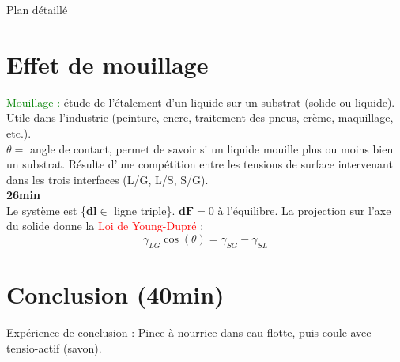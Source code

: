 \begin{reportBlock}{Plan détaillé}
\section{Effet de mouillage}
  \textcolor{green}{Mouillage :} étude de l'étalement d'un liquide sur un substrat (solide ou liquide). Utile dans l'industrie (peinture, encre, traitement des pneus, crème, maquillage, etc.).\\
  $\theta =$ angle de contact, permet de savoir si un liquide mouille plus ou moins bien un substrat. Résulte d'une compétition entre les tensions de surface intervenant dans les trois interfaces (L/G, L/S, S/G). \\
  \textbf{26min}\\
  Le système est \{\textbf{dl}$\in$ ligne triple\}. 
  $\textbf{dF}=0$ à l'équilibre. La projection sur l'axe du solide donne la \textcolor{red}{Loi de Young-Dupré} :
  \begin{equation}
      \gamma_{LG}\cos(\theta) = \gamma_{SG}-\gamma_{SL}
  \end{equation}
  
  \section*{Conclusion (40min)}
  Expérience de conclusion : Pince à nourrice dans eau flotte, puis coule avec tensio-actif (savon).



\end{reportBlock}


